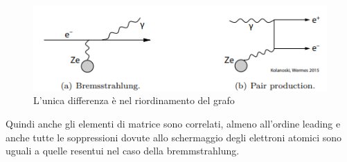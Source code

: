 \hspace{-20pt}
\begin{minipage}{0.48\textwidth}
    \begin{figure}[H]
        \centering
        \includegraphics[width=\textwidth,frame]{Chapters/images/Interazione_radiazione_materia/image-20220220131152626.png}
        \captionsetup{width=\textwidth}
        \caption{L'unica differenza è nel riordinamento del grafo}
        \label{fig:brempair}
    \end{figure}
\end{minipage} \hfill
\begin{minipage}{0.48\textwidth}
Quindi anche gli elementi di matrice sono correlati, almeno all'ordine leading e anche tutte le soppressioni dovute allo schermaggio degli elettroni atomici sono uguali a quelle resentui nel caso della bremmstrahlung.
\end{minipage}
\vspace{10pt}
\\


